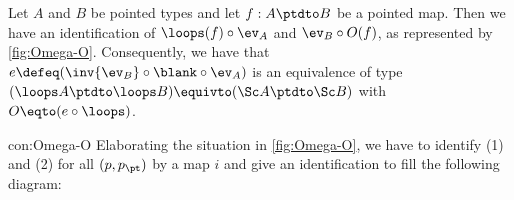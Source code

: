 \begin{construction}\label{con:Omega-O}
Let $A$ and $B$ be pointed types and 
let $f: A\ptdto B$ be a pointed map.
Then we have an identification of $\loops(f)\circ \ev_A$ 
and ${\ev_B} \circ {O(f)}$, as represented by \cref{fig:Omega-O}.
Consequently, we have that $e\defeq(\inv{\ev_B}\circ{{\blank}\circ\ev_A})$
is an equivalence of type 
$(\loops A\ptdto\loops B)\equivto(\Sc A\ptdto\Sc B)$
with $O \eqto (e\circ \loops)$. 
\end{construction}
\begin{implementation}{con:Omega-O}
Elaborating the situation in \cref{fig:Omega-O}, we have to
identify (1) and (2) for all $(p,p_\pt)$ by a map $i$ and
give an identification to fill the following diagram: 


\end{implementation}

